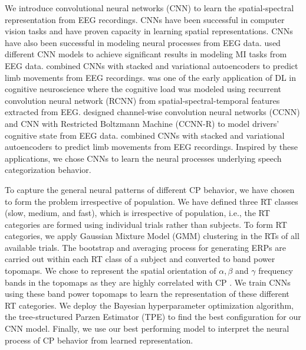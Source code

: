 \documentclass{article}
\begin{document}
We introduce convolutional neural networks (CNN) to learn the spatial-spectral representation from EEG recordings. CNNs have been successful in computer vision tasks and have proven capacity in learning spatial representations. CNNs have also been successful in modeling neural processes from EEG data. \cite{bci_mi4, bci_mi6, bci_mi7} used different CNN models to achieve significant results in modeling MI tasks from EEG data. \cite{bci_mi5, bci_mi2} combined CNNs with stacked and variational autoencoders to predict limb movements from EEG recordings. \cite{bashivan2015} was one of the early application of DL in cognitive neuroscience where the cognitive load was modeled using recurrent convolution neural network (RCNN) from spatial-spectral-temporal features extracted from EEG. \cite{mw1} designed channel-wise convolution neural networks (CCNN) and CNN with Restricted Boltzmann Machine (CCNN-R) to model drivers' cognitive state from EEG data. \cite{bci_mi5, bci_mi2} combined CNNs with stacked and variational autoencoders to predict limb movements from EEG recordings. Inspired by these applications, we chose CNNs to learn the neural processes underlying speech categorization behavior.

To capture the general neural patterns of different CP behavior, we have chosen to form the problem irrespective of population. We have defined three RT classes (slow, medium, and fast), which is irrespective of population, i.e., the RT categories are formed using individual trials rather than subjects. To form RT categories, we apply Gaussian Mixture Model (GMM) clustering in the RTs of all available trials. The bootstrap and averaging process for generating ERPs are carried out within each RT class of a subject and converted to band power topomaps. We chose to represent the spatial orientation of $\alpha, \beta$ and $\gamma$ frequency bands in the topomaps as they are highly correlated with CP \cite{alpha, beta1, net_gamma1}. We train CNNs using these band power topomaps to learn the representation of these different RT categories. We deploy the Bayesian hyperparameter optimization algorithm, the tree-structured Parzen Estimator (TPE) \cite{TPE_1} to find the best configuration for our CNN model. Finally, we use our best performing model to interpret the neural process of CP behavior from learned representation.
\end{document}
